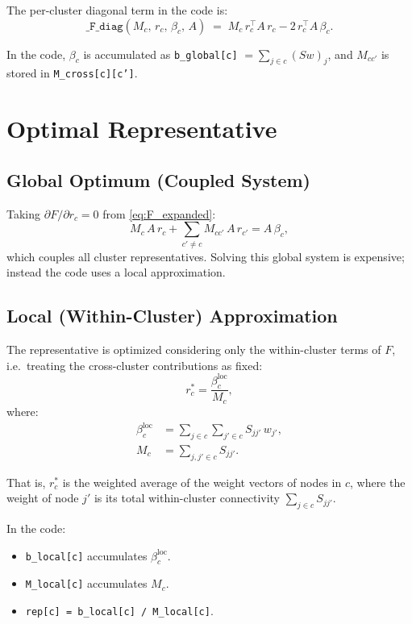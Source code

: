 \documentclass[11pt]{article}
\begin{document}
The per-cluster diagonal term in the code is:
\[
  \texttt{\_F\_diag}(M_c,\,r_c,\,\beta_c,\,A)
  \;=\; M_c\,r_c^\top A\,r_c - 2\,r_c^\top A\,\beta_c.
\]

In the code, $\beta_c$ is accumulated as \texttt{b\_global[c]} $= \sum_{j\in c}(Sw)_j$,
and $M_{cc'}$ is stored in \texttt{M\_cross[c][c']}.

\section{Optimal Representative}

\subsection{Global Optimum (Coupled System)}

Taking $\partial F / \partial r_c = 0$ from \eqref{eq:F_expanded}:
\[
  M_c\,A\,r_c + \sum_{c'\neq c} M_{cc'}\,A\,r_{c'} = A\,\beta_c,
\]
which couples all cluster representatives. Solving this global system is
expensive; instead the code uses a local approximation.

\subsection{Local (Within-Cluster) Approximation}

The representative is optimized considering only the within-cluster terms
of $F$, i.e.\ treating the cross-cluster contributions as fixed:
\[
  r_c^* = \frac{\beta_c^{\mathrm{loc}}}{M_c},
\]
where:
\begin{align}
  \beta_c^{\mathrm{loc}} &= \sum_{j\in c}\sum_{j'\in c} S_{jj'}\,w_{j'},
  \label{eq:beta_loc}\\
  M_c &= \sum_{j,j'\in c} S_{jj'}.
\end{align}

That is, $r_c^*$ is the weighted average of the weight vectors of nodes in $c$,
where the weight of node $j'$ is its total within-cluster connectivity $\sum_{j\in c} S_{jj'}$.

In the code:
\begin{itemize}
  \item \texttt{b\_local[c]} accumulates $\beta_c^{\mathrm{loc}}$.
  \item \texttt{M\_local[c]} accumulates $M_c$.
  \item \texttt{rep[c] = b\_local[c] / M\_local[c]}.
\end{itemize}
\end{document}
